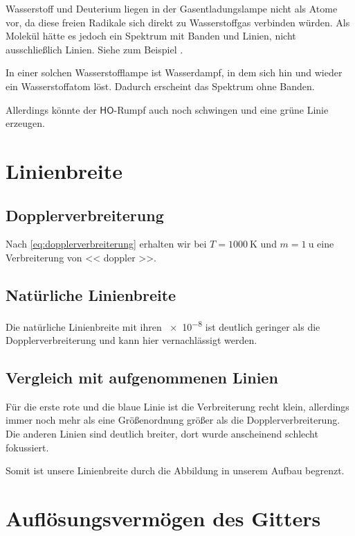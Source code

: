 Wasserstoff und Deuterium liegen in der Gasentladungslampe nicht als Atome vor,
da diese freien Radikale sich direkt zu Wasserstoffgas verbinden würden. Als
Molekül hätte es jedoch ein Spektrum mit Banden und Linien, nicht
ausschließlich Linien. Siehe zum Beispiel
\cite[Abbildung~14.15]{meschede-gerthsen_24}.

In einer solchen Wasserstofflampe ist Wasserdampf, in dem sich hin und wieder
ein Wasserstoffatom löst. Dadurch erscheint das Spektrum ohne Banden.
\parencite[Abschnitt~2.1]{leybold/balmer_lampe}
\parencite{wikipedia/gas_discharge_lamp}

Allerdings könnte der $\mathrm{\mathsf{HO}}$-Rumpf auch noch schwingen und eine
grüne Linie erzeugen.

\section{Linienbreite}

\subsection{Dopplerverbreiterung}

Nach \eqref{eq:dopplerverbreiterung} erhalten wir bei $T = \SI{1000}{\kelvin}$
und $m = \SI{1}{\atomicmassunit}$ eine Verbreiterung von \num{<< doppler >>}.

\subsection{Natürliche Linienbreite}

Die natürliche Linienbreite mit ihren \num{e-8} ist deutlich geringer als die
Dopplerverbreiterung und kann hier vernachlässigt werden.

\subsection{Vergleich mit aufgenommenen Linien}

Für die erste rote und die blaue Linie ist die Verbreiterung recht klein,
allerdings immer noch mehr als eine Größenordnung größer als die
Dopplerverbreiterung. Die anderen Linien sind deutlich breiter, dort wurde
anscheinend schlecht fokussiert.

Somit ist unsere Linienbreite durch die Abbildung in unserem Aufbau begrenzt.

\section{Auflösungsvermögen des Gitters}

